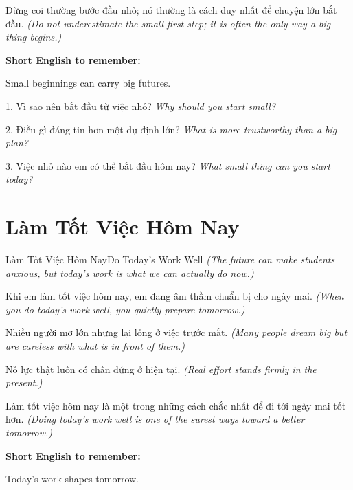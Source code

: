 \begin{baihoc}
Đừng coi thường bước đầu nhỏ; nó thường là cách duy nhất để chuyện lớn bắt đầu.
\textit{(Do not underestimate the small first step; it is often the only way a big thing begins.)}
\end{baihoc}

\begin{ghinhoanh}
\textbf{Short English to remember:}

Small beginnings can carry big futures.

\end{ghinhoanh}

\begin{tuhocnhanh}
1. Vì sao nên bắt đầu từ việc nhỏ? \textit{Why should you start small?}

2. Điều gì đáng tin hơn một dự định lớn? \textit{What is more trustworthy than a big plan?}

3. Việc nhỏ nào em có thể bắt đầu hôm nay? \textit{What small thing can you start today?}
\end{tuhocnhanh}
\ngancach

\section{Làm Tốt Việc Hôm Nay}
\begin{truyen}{Làm Tốt Việc Hôm Nay}{Do Today's Work Well}
\textit{(The future can make students anxious, but today's work is what we can actually do now.)}

Khi em làm tốt việc hôm nay, em đang âm thầm chuẩn bị cho ngày mai.
\textit{(When you do today's work well, you quietly prepare tomorrow.)}

Nhiều người mơ lớn nhưng lại lỏng ở việc trước mắt.
\textit{(Many people dream big but are careless with what is in front of them.)}

Nỗ lực thật luôn có chân đứng ở hiện tại.
\textit{(Real effort stands firmly in the present.)}
\end{truyen}

\begin{baihoc}
Làm tốt việc hôm nay là một trong những cách chắc nhất để đi tới ngày mai tốt hơn.
\textit{(Doing today's work well is one of the surest ways toward a better tomorrow.)}
\end{baihoc}

\begin{ghinhoanh}
\textbf{Short English to remember:}

Today's work shapes tomorrow.

\end{ghinhoanh}

